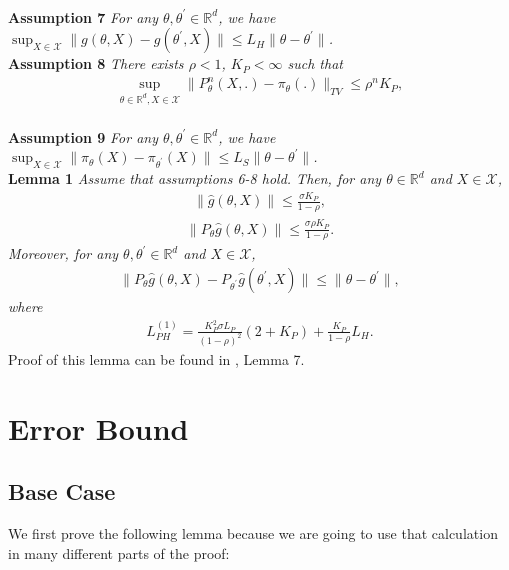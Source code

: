 \documentclass[a4paper]{article}
\newcommand{\norm}[1]{\|#1 \|}
\newcommand{\constLPH}[1]{L_{PH}^{(#1)}}
\begin{document}
	\\
	\textbf{Assumption 7} \textit{
		For any $\theta, \theta^{\prime} \in \mathbb{R}^{d}$, we have $\sup_{X \in \mathcal{X}}\norm{g\left(\theta, X\right) - g\left(\theta^{\prime}, X\right)} \le L_{H}\norm{\theta - \theta^{\prime}}$.
	}
	\\
	\textbf{Assumption 8} \textit{
		There exists $\rho < 1$, $K_{P} < \infty$ such that
		\begin{align*}
			\sup_{\theta \in \mathbb{R}^{d}, X \in \mathcal{X}} \norm{P_{\theta}^{n}\left(X, .\right) - \pi_{\theta}(.)}_{TV} \le \rho^{n}K_{P},
		\end{align*}
	}
	\\
	\textbf{Assumption 9} \textit{
		For any $\theta, \theta^{\prime} \in \mathbb{R}^{d}$, we have $\sup_{X \in \mathcal{X}}\norm{\pi_{\theta}(X) - \pi_{\theta^{\prime}}(X)} \le L_{S}\norm{\theta - \theta^{\prime}}$.
	}
	\\
	\textbf{Lemma 1} \textit{
		Assume that assumptions 6-8 hold. Then, for any $\theta \in \mathbb{R}^{d}$ and $X \in \mathcal{X}$,
		\begin{align*}
			\norm{\hat{g}\left(\theta, X\right)} \le \frac{\sigma K_{P}}{1 - \rho},
		\end{align*}
		\begin{align*}
			\norm{P_{\theta}\hat{g}\left(\theta, X\right)} \le \frac{\sigma \rho K_{P}}{1 - \rho}.
		\end{align*}
		Moreover, for any $\theta, \theta^{\prime} \in \mathbb{R}^{d}$ and $X \in \mathcal{X}$,
		\begin{align*}
			\norm{P_{\theta}\hat{g}\left(\theta, X\right) - P_{\theta^{\prime}}\hat{g}\left(\theta^{\prime}, X\right)} \le \norm{\theta - \theta^{\prime}},
		\end{align*}
		where
		\begin{align*}
			\constLPH{1} = \frac{K_{P}^{2}\sigma L_{P}}{(1 - \rho)^{2}}\left(2 + K_{P}\right) + \frac{K_{P}}{1 - \rho}L_{H}.
		\end{align*}
	}
	Proof of this lemma can be found in \cite{karimi2019non}, Lemma 7.
	\section{Error Bound}
	
	
	\subsection{Base Case}
	
	We first prove the following lemma because we are going to use that calculation in many different parts of the proof:
	
\end{document}
